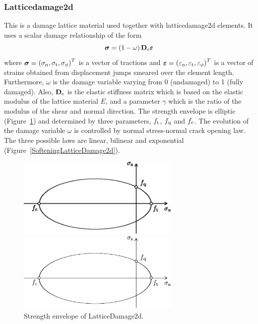 \documentclass[a4paper]{article}
\begin{document}
\subsubsection{Latticedamage2d}
This is a damage lattice material used together with latticedamage2d elements.
It uses a scalar damage relationship of the form
\begin{equation}
\boldsymbol{\sigma} = \left(1-\omega\right) \mathbf{D}_{\rm e} \boldsymbol{\varepsilon}
\end{equation}
where $\boldsymbol{\sigma} = \left( \sigma_{\rm n}, \sigma_{\rm t}, \sigma_{\rm \phi}\right)^{T}$ is a vector of tractions and $\boldsymbol{\varepsilon} = \left( \varepsilon_{\rm n}, \varepsilon_{\rm t}, \varepsilon_{\rm \phi}\right)^{T}$ is a vector of strains obtained from displacement jumps smeared over the element length.
Furthermore, $\omega$ is the damage variable varying from 0 (undamaged) to 1 (fully damaged). 
Also, $\mathbf{D}_{\rm e}$ is the elastic stiffness matrix which is based on the elastic modulus of the lattice material $E$, and a parameter $\gamma$ which is the ratio of the modulus of the shear and normal direction.
The strength envelope is elliptic (Figure~\ref{StrengthLatticeDamage2d}) and determined by three  parameters, $f_{\rm t}$, $f_{\rm q}$ and $f_{\rm c}$. The evolution of the damage variable $\omega$ is controlled by normal stress-normal crack opening law. The three possible laws are linear, bilinear and exponential (Figure~\ref{SofteningLatticeDamage2d}).

\begin{figure}[!htb]
\begin{htmlonly}
  \centerline{\includegraphics[width=0.7\textwidth]{figStrengthLatticeDamage2d.eps}}
\end{htmlonly}
 \centerline{\includegraphics[width=0.7\textwidth]{figStrengthLatticeDamage2d.pdf}}
  \caption{Strength envelope of LatticeDamage2d.}
  \label{StrengthLatticeDamage2d}
\end{figure}
\end{document}
